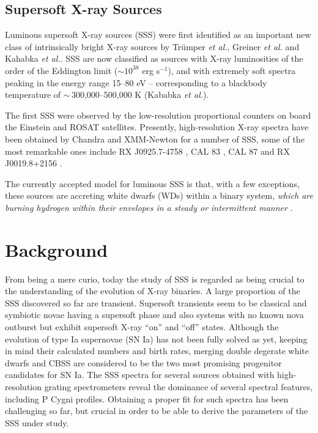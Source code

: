         \subsection{Supersoft X-ray Sources} \label{introduction:introduction:sss}
        	Luminous supersoft X-ray sources (SSS) were first identified as an important new class of intrinsically bright X-ray sources by Tr{\"u}mper \emph{et al.}\cite{trumper91}, Greiner \emph{et al.}\cite{greiner91} and Kahabka \emph{et al.}\cite{kahabka06}. SSS are now classified as sources with X-ray luminosities of the order of the Eddington limit ($\sim 10^{38}$ erg s$^{-1}$), and with extremely soft spectra peaking in the energy range 15--80 eV -- corresponding to a blackbody temperature of $\sim\,$300,000--500,000 K (Kababka \emph{et al.})\cite{kahabka97}.
        	
        	The first SSS were observed by the low-resolution proportional counters on board the Einstein and ROSAT satellites. Presently, high-resolution X-ray spectra have been obtained by Chandra and XMM-Newton for a number of SSS, some of the most remarkable ones include RX J0925.7-4758 \cite{bearda2002,motch2002}, CAL 83 \cite{lanz2005}, CAL 87 \cite{orio2004} and RX J0019.8+2156 \cite{schwarz2004}.
        	
        	The currently accepted model for luminous SSS is that, with a few exceptions, these sources are accreting white dwarfs (WDs) within a binary system, \emph{which are burning hydrogen within their envelopes in a steady or intermittent manner} \cite{vandenHeuvel92}.
    
    \section{Background} \label{introduction:background}
        From being a mere curio, today the study of SSS is regarded as being crucial to the understanding of the evolution of X-ray binaries. A large proportion of the SSS discovered so far are transient. Supersoft transients seem to be classical and symbiotic novae having a supersoft phase and also systems with no known nova outburst but exhibit supersoft X-ray ``on'' and ``off'' states. Although the evolution of type Ia supernovae (SN Ia) has not been fully solved as yet, keeping in mind their calculated numbers and birth rates, merging double degerate white dwarfs and CBSS are considered to be the two most promising progenitor candidates for SN Ia. The SSS spectra for several sources obtained with high-resolution grating spectrometers reveal the dominance of several spectral features, including P Cygni profiles. Obtaining a proper fit for such spectra has been challenging so far, but crucial in order to be able to derive the parameters of the SSS under study.
    
